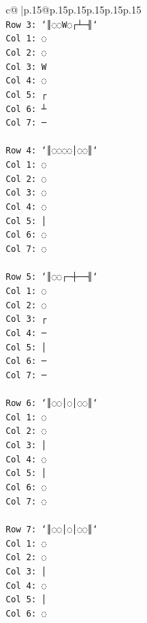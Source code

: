 \documentclass{article}
\begin{document}
{\begin{supertabular}{c@{$\;$}|p{.15\linewidth}@{}p{.15\linewidth}p{.15\linewidth}p{.15\linewidth}p{.15\linewidth}p{.15\linewidth}}
{{{\\ 
\texttt{Row 3: `║◌◌W◌┌┴─╢`} \\
\texttt{Col 1: ◌} \\
\texttt{Col 2: ◌} \\
\texttt{Col 3: W} \\
\texttt{Col 4: ◌} \\
\texttt{Col 5: ┌} \\
\texttt{Col 6: ┴} \\
\texttt{Col 7: ─} \\
\\ 
\texttt{Row 4: `║◌◌◌◌│◌◌║`} \\
\texttt{Col 1: ◌} \\
\texttt{Col 2: ◌} \\
\texttt{Col 3: ◌} \\
\texttt{Col 4: ◌} \\
\texttt{Col 5: │} \\
\texttt{Col 6: ◌} \\
\texttt{Col 7: ◌} \\
\\ 
\texttt{Row 5: `║◌◌┌─┼──╢`} \\
\texttt{Col 1: ◌} \\
\texttt{Col 2: ◌} \\
\texttt{Col 3: ┌} \\
\texttt{Col 4: ─} \\
\texttt{Col 5: │} \\
\texttt{Col 6: ─} \\
\texttt{Col 7: ─} \\
\\ 
\texttt{Row 6: `║◌◌│◌│◌◌║`} \\
\texttt{Col 1: ◌} \\
\texttt{Col 2: ◌} \\
\texttt{Col 3: │} \\
\texttt{Col 4: ◌} \\
\texttt{Col 5: │} \\
\texttt{Col 6: ◌} \\
\texttt{Col 7: ◌} \\
\\ 
\texttt{Row 7: `║◌◌│◌│◌◌║`} \\
\texttt{Col 1: ◌} \\
\texttt{Col 2: ◌} \\
\texttt{Col 3: │} \\
\texttt{Col 4: ◌} \\
\texttt{Col 5: │} \\
\texttt{Col 6: ◌} \\
}}}
\end{supertabular}}
\end{document}
